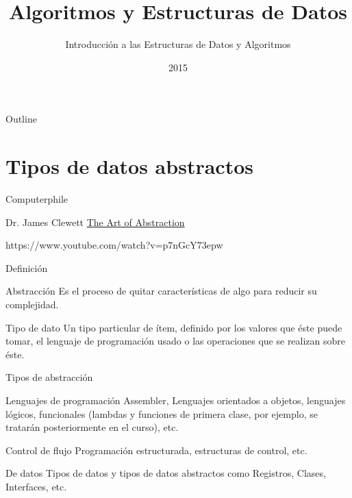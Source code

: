 \documentclass[aspectratio=169]{beamer}
\title{Algoritmos y Estructuras de Datos}
\subtitle{Introducción a las Estructuras de Datos y Algoritmos}
\date{2015}
\institute{\href{http://www.upc.edu.pe}{Universidad Peruana de Ciencias Aplicadas}}
\begin{document}
\maketitle

\begin{frame}{Outline}
  \tableofcontents
\end{frame}

\section{Tipos de datos abstractos}

\begin{frame}{Computerphile}

\begin{block}{Dr. James Clewett}
\href{https://www.youtube.com/watch?v=p7nGcY73epw}{The Art of Abstraction}

https://www.youtube.com/watch?v=p7nGcY73epw
\end{block}

\end{frame}

\begin{frame}{Definición}

\begin{block}{Abstracción}
Es el proceso de quitar características de algo para reducir su complejidad.
\end{block}

\begin{block}{Tipo de dato}
Un tipo particular de ítem, definido por los valores que éste puede tomar, el lenguaje de programación usado o las operaciones que se realizan sobre éste.
\end{block}

\end{frame}

\begin{frame}{Tipos de abstracción}

\begin{block}{Lenguajes de programación}
Assembler, Lenguajes orientados a objetos, lenguajes lógicos, funcionales (lambdas y funciones de primera clase, por ejemplo, se tratarán posteriormente en el curso), etc.
\end{block}

\begin{block}{Control de flujo}
Programación estructurada, estructuras de control, etc.
\end{block}

\begin{block}{De datos}
Tipos de datos y tipos de datos abstractos como Registros, Clases, Interfaces, etc.
\end{block}

\end{frame}
\end{document}
